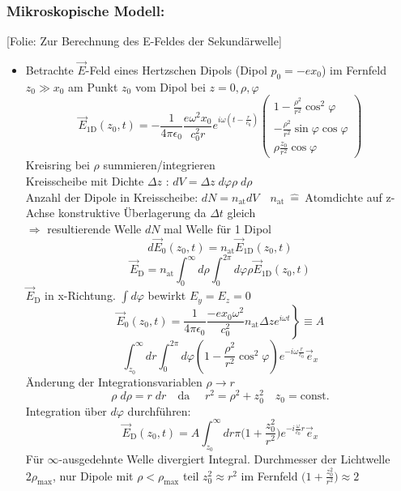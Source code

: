 \documentclass[titlepage,12pt,a4paper,ngerman]{report}
\newcommand{\tx}[1]{\textrm{#1}}
\newcommand{\folie}[1]{\color{gray}[Folie: #1]\color{black}}
\newcommand{\const}{\tx{const.}}
\begin{document}
\subsubsection{Mikroskopische Modell:}
\folie{Zur Berechnung des E-Feldes der Sekundärwelle}
\begin{itemize}
	\item Betrachte $ \vec{E} $-Feld eines Hertzschen Dipols (Dipol $ p_0 = - e x_0 $) im Fernfeld $ z_0 \gg x_0 $ am Punkt $ z_0 $ vom Dipol bei $ z = 0, \rho, \varphi$
	$$\vec{E}_{\tx{1D}} (z_0,t) = - \frac{1}{ 4 \pi \epsilon_0} \frac{e \omega^2 x_0}{c_0^2 r} e ^{i \omega (t - \frac{r}{c_0})} \begin{pmatrix}
	1 - \frac{\rho^2}{r^2} \cos^2 \varphi\\
	- \frac{\rho^2}{r^2} \sin \varphi \cos \varphi\\
	\rho \frac{z_0}{r^2} \cos \varphi
	\end{pmatrix}$$
	Kreisring bei $ \rho $ summieren/integrieren\\
	Kreisscheibe mit Dichte $ \Delta z $ : $ d V = \Delta z \; d\varphi \rho \; d \rho $\\
	Anzahl der Dipole in Kreisscheibe: $ d N = n_{\tx{at}} d V \quad n_{\tx{at}} \ \widehat{=} \ \tx{Atomdichte} $ auf z-Achse konstruktive Überlagerung da $ \Delta t $ gleich\\
	$ \Rightarrow $ resultierende Welle $ dN $ mal Welle für 1 Dipol
	$$d \vec{E}_0 (z_0,t) = n_{\tx{at}} \vec{E}_{\tx{1D}} (z_0,t)$$
	$$\vec{E}_{\tx{D}} = n_{\tx{at}} \int_{0}^{\infty} d\rho \int_{0}^{2 \pi} d \varphi \rho \vec{E}_{\tx{1D}} (z_0,t)$$
	$ \vec{E}_{\tx{D}} $ in x-Richtung. $ \int d\varphi $ bewirkt $ E_y = E_z = 0 $
	$$\left. \vec{E}_0 (z_0,t) = \frac{1}{4 \pi \epsilon_0} \frac{-e x_0 \omega^2 }{c_0^2} n _{\tx{at}} \Delta z e ^{i \omega t} \right\} \equiv A$$
	$$\int_{z_0}^{\infty} dr \int_{0}^{2 \pi} d \varphi (1 - \frac{\rho^2}{r^2} \cos^2 \varphi) e^{-i \omega \frac{r}{c_0}} \vec{e}_x$$
	Änderung der Integrationsvariablen $ \rho \rightarrow r $
	$$\rho \; d \rho = r \; dr \quad \tx{da } \quad r^2 = \rho^2 + z_0^2 \quad z_0 = \const$$
	Integration über $ d \varphi $ durchführen:
	$$\vec{E}_{\tx{D}}(z_0,t) = A \int_{z_0}^{\infty} dr \pi \Big(1 + \frac{z_0^2}{r^2}\Big)  e^{-i\frac{\omega}{c_0} r} \vec{e}_x$$
	Für $ \infty $-ausgedehnte Welle divergiert Integral. Durchmesser der Lichtwelle $ 2 \rho_{\tx{max}} $, nur Dipole mit $ \rho < \rho_{\tx{max}} $ teil $ z_0^2 \approx r^2 $ im Fernfeld $ \Big(1 + \frac{z_0^2}{r^2}\Big) \approx 2 $\\

\end{itemize}
\end{document}
